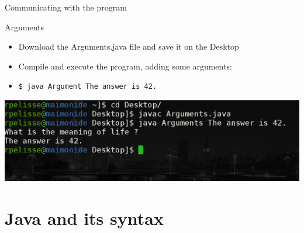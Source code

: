 {  \begin{frame}{Communicating with the program}
    \begin{block}{Arguments}
      \begin{itemize}
        \item Download the Arguments.java file and save it on the Desktop
        \item Compile and execute the program, adding some arguments:
        \item \texttt{\$ java Argument The answer is 42.}
      \end{itemize}
    \end{block}
    \begin{center}
      \includegraphics[scale=0.2]{img/arguments.png}
    \end{center}
  \end{frame}

  \section{Java and its syntax}
}
